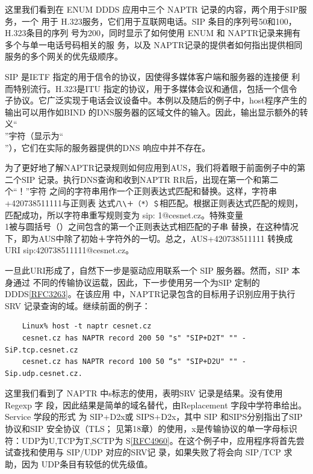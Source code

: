 这里我们看到在 ENUM DDDS 应用中三个 NAPTR 记录的内容，两个用于SIP服务，一个
用于 H.323服务，它们用于互联网电话。SIP 条目的序列号50和100，H.323条目的序列
号为200，同时显示了如何使用 ENUM 和 NAPTR记录来拥有多个与单一电话号码相关的服
务，以及 NAPTR记录的提供者如何指出提供相同服务的多个网关的优先级顺序。

\begin{tcolorbox}
  SIP 是IETF 指定的用于信令的协议，因使得多媒体客户端和服务器的连接便
  利而特别流行。H.323是ITU 指定的协议，用于多媒体会议和通信，包括一个信令
  子协议。它广泛实现于电话会议设备中。本例以及随后的例子中，host程序产生的
  输出可以用作如BIND 的DNS服务器的区域文件的输入。因此，输出显示额外的转
  义“\\”宇符（显示为“\\”），它们在实际的服务器提供的DNS 响应中并不存在。
\end{tcolorbox}

为了更好地了解NAPTR记录规则如何应用到AUS，我们将着眼于前面例子中的第
二个SIP 记录。执行DNS查询和收到NAPTR RR后，出现在第一个和第二个“！”宇符
之间的字符串用作一个正则表达式匹配和替换。这样，字符串+420738511111与正则表
达式\verb|八\＋（*）＄|相匹配。根据正则表达式匹配的规则，匹配成功，所以字符串重写规则变为
sip: 1@cesnet.cz。特殊变量\\1被与圆括号（）之间包含的第一个正则表达式相匹配的子串
替换，在这种情况下，即为AUS中除了初始＋字符外的一切。总之，AUS+420738511111
转换成 URI sip:420738511111@cesnet.cz。

一旦此URI形成了，自然下一步是驱动应用联系一个 SIP 服务器。然而，SIP 本身通过
不同的传输协议运载，因此，下一步使用另一个为SIP
定制的DDDS\href{https://www.rfc-editor.org/rfc/rfc3263}{[RFC3263]}。在该应用
中，NAPTR记录包含的目标用子识别应用于执行SRV 记录查询的域。继续前面的例子：

\begin{verbatim}
    Linux% host -t naptr cesnet.cz
    cesnet.cz has NAPTR record 200 50 "s" "SIP+D2T" "" -SiP.tcp.cesnet.cz
    cesnet.cz has NAPTR record 100 50 “s" "SIP+D2U" "" -Sip.udp.cesnet.cz.
\end{verbatim}

这里我们看到了 NAPTR 中s标志的使用，表明SRV 记录是结果。没有使用 Regexp 字
段，因此结果是简单的域名替代，由Replacement 字段中学符串给出。Service 学段的形式
为 SIP+D2x或 SIPS+D2x，其中 SIP 和SIPS分别指出了SIP 协议和SIP 安全协议（TLS；
见第18章）的使用，x是传输协议的单一字母标识符：UDP为U,TCP为T,SCTP为
S\href{https://www.rfc-editor.org/rfc/rfc4960}{[RFC4960]}。在这个例子中，应用程序将首先尝试查找和使用与
SIP/UDP 对应的SRV记
录，如果失败了将会向 SIP/TCP 求助，因为 UDP条目有较低的优先级值。

